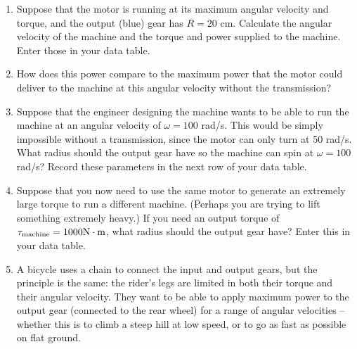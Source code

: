 \documentclass[12pt]{article}
\begin{document}
\begin{enumerate}
\vspace{2in}

\item  Suppose that the motor is running at its maximum angular velocity and torque, and the output (blue) gear has $R=20$ cm. Calculate the angular velocity of the machine and the torque and power supplied to the machine. Enter those in your data table.


\item How does this power compare to the maximum power that the motor could deliver to the machine at this angular velocity without the transmission?


\vspace{1.5in}


\item Suppose that the engineer designing the machine wants to be able to run the machine at an angular velocity of $\omega = 100$ rad/s. This would be simply impossible without a transmission, since the motor can only turn at 50 rad/s. What radius should the output gear have so the machine can spin at $\omega = 100$ rad/s? Record these parameters in the next row of your data table.


\vspace{3in}


\item Suppose that you now need to use the same motor to generate an extremely large torque to run a different machine. (Perhaps you are trying to lift something extremely heavy.) If you need an output torque of $\tau_{\rm{machine}} = 1000 \rm N \cdot \rm m$, what radius should the output gear have? Enter this in your data table.


\newpage


\item A bicycle uses a chain to connect the input and output gears, but the principle is the same: the rider's legs are limited in both their torque and their angular velocity. They want to be able to apply maximum power to the output gear (connected to the rear wheel) for a range of angular velocities -- whether this is to climb a steep hill at low speed, or to go as fast as possible on flat ground. 


\end{enumerate}
\end{document}
